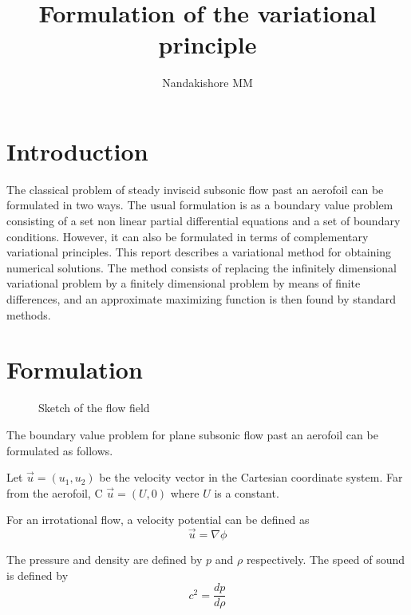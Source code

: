\documentclass[a4paper]{article}
\author{Nandakishore MM}
\title{Formulation of the variational principle}
\begin{document}
	\maketitle
	
	\tableofcontents
	
	\newpage


	\section{Introduction}
	The classical problem of steady inviscid subsonic flow past an aerofoil can be formulated in two ways. The usual formulation is as a boundary value problem consisting of a set non linear partial differential equations and a set of boundary conditions. However, it can also be formulated in terms of complementary variational principles. This report describes a variational method for obtaining numerical solutions. The method consists of replacing the infinitely dimensional variational problem by a finitely dimensional problem by means of finite differences, and an approximate maximizing function is then found by standard methods. 

	\section{Formulation}
	
	
	\begin{figure}
		\centering
  		\caption{Sketch of the flow field}
  	\end{figure}	
  	
	The boundary value problem for plane subsonic flow	 past an aerofoil can be formulated as follows.
	
	Let $\vec{u}=(u_1,u_2)$ be the velocity vector in the Cartesian coordinate system. Far from the aerofoil, C $\vec{u}=(U,0)$ where $U$ is a constant.
	
	For an irrotational flow, a velocity potential can be defined as 
	$$ \vec{u} = \nabla \phi$$
	
	The pressure and density are defined by $p$ and $\rho$ respectively. The speed of sound is defined by
	$$c^2=\frac{dp}{d\rho}$$
	
\end{document}
